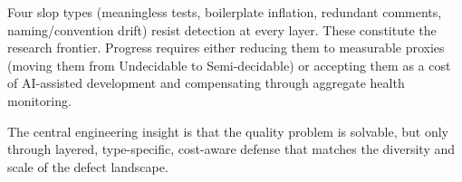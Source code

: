 \documentclass[11pt, a4paper, copyright]{googledeepmind}
\begin{document}
Four slop types (meaningless tests, boilerplate inflation, redundant comments, naming/convention drift) resist detection at every layer. These constitute the research frontier. Progress requires either reducing them to measurable proxies (moving them from Undecidable to Semi-decidable) or accepting them as a cost of AI-assisted development and compensating through aggregate health monitoring.

The central engineering insight is that the quality problem is solvable, but only through layered, type-specific, cost-aware defense that matches the diversity and scale of the defect landscape.



\end{document}
